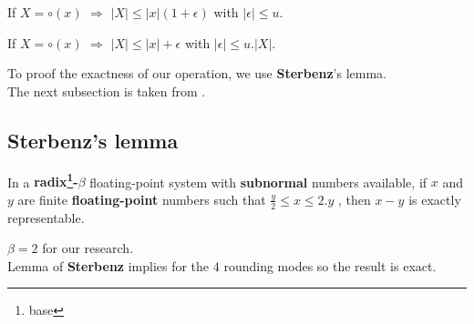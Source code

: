 \begin{coroll}\label{cor:ux}
If $X = \circ(x)$   $\Rightarrow$ $\lvert X \rvert \le \lvert x \rvert (1 + \epsilon)$ with $\lvert \epsilon \rvert \le u$.
\end{coroll}

\begin{coroll} \label{coroll:UX}
If $X = \circ(x)$   $\Rightarrow$ $\lvert X \rvert \le \lvert x \rvert +   \epsilon$ with $\lvert \epsilon \rvert \le u . \lvert X \rvert$.
\end{coroll}
To proof the exactness of our operation, we use \textbf{Sterbenz}’s lemma.\\
The next subsection is taken from \cite{muller2010handbook}.
\subsection{\textbf{Sterbenz}’s lemma}
\begin{lemma}\label{lem:ster}
In a \textbf{radix\footnote{base}-$\beta$} floating-point system with \textbf{subnormal} numbers available, if $x$ and $y$ are finite \textbf{floating-point} numbers such that
$\frac{y}{2} \le x \le 2.y$ , then $x - y$ is exactly representable.
\end{lemma}
$\beta = 2$ for our research.\\
Lemma of \textbf{Sterbenz} implies for the $4$ rounding modes so the result is exact.
